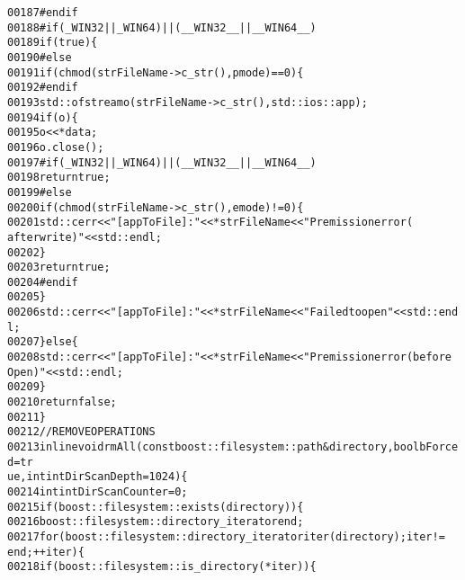 \begin{footnotesize}
\begin{alltt}
00187 \textcolor{preprocessor}{#endif}
00188 \textcolor{preprocessor}{}\textcolor{preprocessor}{    #if ( \_WIN32 || \_WIN64 ) || ( \_\_WIN32\_\_ || \_\_WIN64\_\_ )}
00189 \textcolor{preprocessor}{}        \textcolor{keywordflow}{if}(\textcolor{keyword}{true})\{
00190 \textcolor{preprocessor}{    #else}
00191 \textcolor{preprocessor}{}        \textcolor{keywordflow}{if} (chmod(strFileName->c\_str(),pmode)==0)\{
00192 \textcolor{preprocessor}{    #endif}
00193 \textcolor{preprocessor}{}            std::ofstream o(strFileName->c\_str(),std::ios::app);
00194             \textcolor{keywordflow}{if}(o)\{
00195                 o << *data;
00196                 o.close();
00197 \textcolor{preprocessor}{            #if ( \_WIN32 || \_WIN64 ) || ( \_\_WIN32\_\_ || \_\_WIN64\_\_ )}
00198 \textcolor{preprocessor}{}                \textcolor{keywordflow}{return} \textcolor{keyword}{true};
00199 \textcolor{preprocessor}{            #else}
00200 \textcolor{preprocessor}{}                \textcolor{keywordflow}{if} (chmod(strFileName->c\_str(),emode)!=0)\{
00201                     std::cerr<<\textcolor{stringliteral}{"[appToFile]: "}<<*strFileName<<\textcolor{stringliteral}{" Premission error(
      after write)"}<<std::endl;
00202                 \}
00203                 \textcolor{keywordflow}{return} \textcolor{keyword}{true};
00204 \textcolor{preprocessor}{            #endif}
00205 \textcolor{preprocessor}{}            \}
00206             std::cerr<<\textcolor{stringliteral}{"[appToFile]: "}<<*strFileName<<\textcolor{stringliteral}{" Failed to open"}<<std::end
      l;
00207         \}\textcolor{keywordflow}{else}\{
00208             std::cerr<<\textcolor{stringliteral}{"[appToFile]: "}<<*strFileName<<\textcolor{stringliteral}{" Premission error (before 
      Open)"}<<std::endl;
00209         \}
00210         \textcolor{keywordflow}{return} \textcolor{keyword}{false};
00211     \}
00212     \textcolor{comment}{//REMOVE OPERATIONS}
00213     \textcolor{keyword}{inline} \textcolor{keywordtype}{void} rmAll(\textcolor{keyword}{const} boost::filesystem::path & directory,\textcolor{keywordtype}{bool} bForced = \textcolor{keyword}{tr
      ue},\textcolor{keywordtype}{int} intDirScanDepth =1024)\{
00214         \textcolor{keywordtype}{int} intDirScanCounter = 0;
00215         \textcolor{keywordflow}{if}( boost::filesystem::exists( directory ) )\{
00216             boost::filesystem::directory\_iterator end ;
00217             \textcolor{keywordflow}{for}( boost::filesystem::directory\_iterator iter(directory) ; iter != 
      end ; ++iter )\{
00218                 \textcolor{keywordflow}{if} ( boost::filesystem::is\_directory( *iter ) )\{

\end{alltt}
\end{footnotesize}
